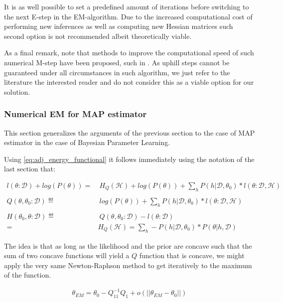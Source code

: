 \documentclass[11pt]{article}
\begin{document}
\begin{article}
It is as well possible to set a predefined amount of iterations
before switching to the next E-step in the EM-algorithm. Due to the
increased computational cost of performing new inferences as well as
computing new Hessian matrices such second option is not
recommended albeit theoretically viable.

As a final remark, note that methods to improve the computational
speed of such numerical M-step have been proposed, such in
\cite{Louis_1982}. As uphill steps cannot be guaranteed under all
circumstances in such algorithm, we just refer to the literature the
interested reader and do not consider this as a viable option for
our solution.

\subsubsection{Numerical EM for MAP estimator}
\label{sec:orgb26e491}

This section generalizes the arguments of the previous section to
the case of MAP estimator in the case of Bayesian Parameter
Learning.

Using \ref{eq:adj_energy_functional} it follows immediately using the
notation of the last section that:

\begin{align} \label{eq:likelihood_energy_map_iterative}
l (\theta: \mathscr{D}) + log(P(\theta)) =& \ H_Q (\mathscr {H}) + log(P(\theta)) + \sum_h P(h | \mathscr{D}, \theta_0) * l (\theta: \mathscr{D}, \mathscr{H})\\
\nonumber\\
Q(\theta, \theta_0 : \mathscr{D}) \eqdef& \ log(P(\theta)) + \sum_h P(h | \mathscr{D}, \theta_0) * l (\theta: \mathscr{D}, \mathscr{H})\\
\nonumber\\  
H(\theta_0, \theta: \mathscr{D}) \eqdef& \ Q(\theta, \theta_0 : \mathscr{D}) - l (\theta: \mathscr{D}) \\
                                 =& H_Q (\mathscr {H}) = \sum_h - P(h | \mathscr{D}, \theta_0) * P(\theta | h, \mathscr{D}) \nonumber
\end{align}

The idea is that as long as the likelihood and the prior are
concave such that the sum of two concave functions will yield a \(Q\)
function that is concave, we might apply the very same
Newton-Raphson method to get iteratively to the maximum of the
function.

\begin{align} 
 \theta_{EM}  = \theta_{0} - Q_{11}^{-1} Q_1 + o(||\theta_{EM} - \theta_{0}||) \label{eq:em-iterative}
\end{align}


\end{article}
\end{document}
